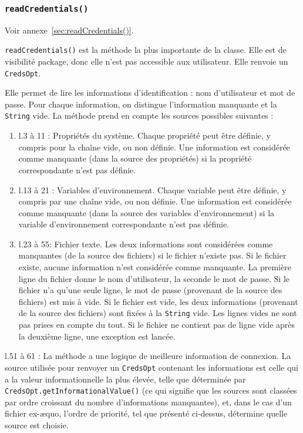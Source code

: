\subsubsection{\texttt{readCredentials()}}
Voir annexe~\ref{sec:readCredentials()}.

\texttt{readCredentials()} est la méthode la plus importante de la classe. Elle est de visibilité package, donc elle n'est pas accessible aux utilisateur. Elle renvoie un \texttt{CredsOpt}.

Elle permet de lire les informations d'identification : nom d'utilisateur et mot de passe. Pour chaque information, on distingue l'information manquante et la \texttt{String} vide. La méthode prend en compte les sources possibles suivantes :

\begin{enumerate}
    \item l.3 à 11 : Propriétés du système. Chaque propriété peut être définie, y compris pour la chaîne vide, ou non définie. Une information est considérée comme manquante (dans la source des propriétés) si la propriété correspondante n'est pas définie.
    \item l.13 à 21 : Variables d'environnement. Chaque variable peut être définie, y compris par une chaîne vide, ou non définie. Une information est considérée comme manquante (dans la source des variables d'environnement) si la variable d'environnement correspondante n'est pas définie.
    \item l.23 à 55: Fichier texte. Les deux informations sont considérées comme manquantes (de la source des fichiers) si le fichier n'existe pas. Si le fichier existe, aucune information n'est considérée comme manquante. La première ligne du fichier donne le nom d'utilisateur, la seconde le mot de passe. Si le fichier n'a qu'une seule ligne, le mot de passe (provenant de la source des fichiers) est mis à vide. Si le fichier est vide, les deux informations (provenant de la source des fichiers) sont fixées à la \texttt{String} vide. Les lignes vides ne sont pas prises en compte du tout. Si le fichier ne contient pas de ligne vide après la deuxième ligne, une exception est lancée.
\end{enumerate}
l.51 à 61 : La méthode a une logique de meilleure information de connexion. La source utilisée pour renvoyer un \texttt{CredsOpt} contenant les informations est celle qui a la valeur informationnelle la plus élevée, telle que déterminée par \texttt{CredsOpt.getInformationalValue()} (ce qui signifie que les sources sont classées par ordre croissant du nombre d'informations manquantes), et, dans le cas d'un fichier ex-\ae quo, l'ordre de priorité, tel que présenté ci-dessus, détermine quelle source est choisie.

